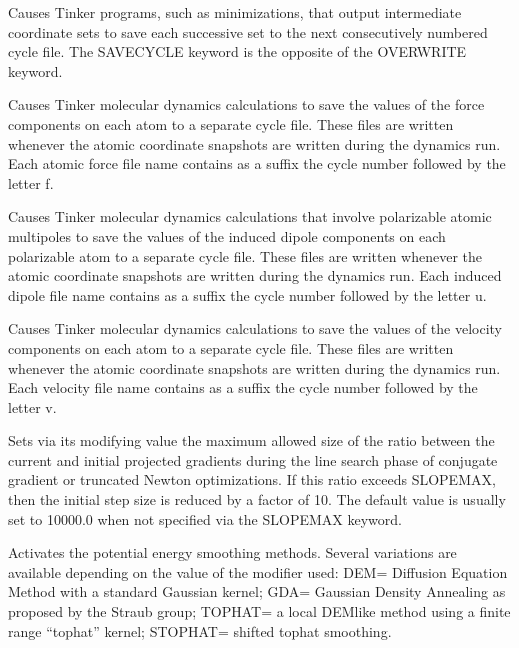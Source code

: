\documentclass[letterpaper,11pt,english]{sphinxmanual}
\begin{document}
  Causes Tinker programs, such as minimizations, that output intermediate coordinate sets to save each successive set to the next consecutively numbered cycle file. The SAVE\sphinxhyphen{}CYCLE keyword is the opposite of the OVERWRITE keyword.

  Causes Tinker molecular dynamics calculations to save the values of the force components on each atom to a separate cycle file. These files are written whenever the atomic coordinate snapshots are written during the dynamics run. Each atomic force file name contains as a suffix the cycle number followed by the letter f.

  Causes Tinker molecular dynamics calculations that involve polarizable atomic multipoles to save the values of the induced dipole components on each polarizable atom to a separate cycle file. These files are written whenever the atomic coordinate snapshots are written during the dynamics run. Each induced dipole file name contains as a suffix the cycle number followed by the letter u.


  Causes Tinker molecular dynamics calculations to save the values of the velocity components on each atom to a separate cycle file. These files are written whenever the atomic coordinate snapshots are written during the dynamics run. Each velocity file name contains as a suffix the cycle number followed by the letter v.



  Sets via its modifying value the maximum allowed size of the ratio between the current and initial projected gradients during the line search phase of conjugate gradient or truncated Newton optimizations. If this ratio exceeds SLOPEMAX, then the initial step size is reduced by a factor of 10. The default value is usually set to 10000.0 when not specified via the SLOPEMAX keyword.


  Activates the potential energy smoothing methods. Several variations are available depending on the value of the modifier used: DEM= Diffusion Equation Method with a standard Gaussian kernel; GDA= Gaussian Density Annealing as proposed by the Straub group; TOPHAT= a local DEM\sphinxhyphen{}like method using a finite range “tophat” kernel; STOPHAT= shifted tophat smoothing.
\end{document}
